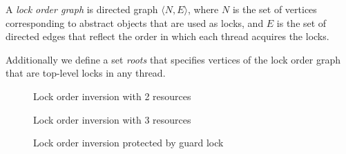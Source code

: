 \begin{definition}
A \emph{lock order graph} is directed graph $\langle N, E \rangle$, where $N$ is the set of vertices corresponding to abstract objects that are used as locks, and $E$ is the set of directed edges that reflect the order in which each thread acquires the locks.
\end{definition}

\begin{definition}
Additionally we define a set \emph{roots} that specifies vertices of the lock order graph that are top-level locks in any thread.
\end{definition}

\begin{figure}[h]
\begin{center}
\caption{Lock order inversion with 2 resources}
\end{center}
\end{figure}

\begin{figure}[h]
\begin{center}
\caption{Lock order inversion with 3 resources}
\end{center}
\end{figure}

\begin{figure}[h]
\begin{center}
\caption{Lock order inversion protected by guard lock}
\end{center}
\end{figure}
